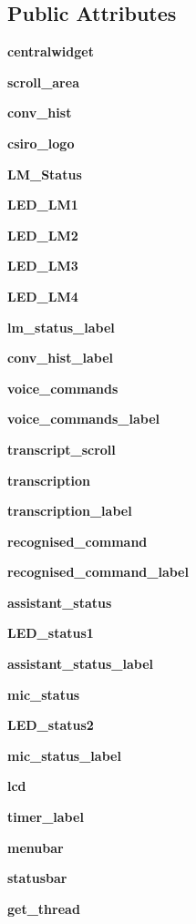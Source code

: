 \subsection*{Public Attributes}
\begin{DoxyCompactItemize}
\item 
\textbf{ centralwidget}
\item 
\textbf{ scroll\+\_\+area}
\item 
\textbf{ conv\+\_\+hist}
\item 
\textbf{ csiro\+\_\+logo}
\item 
\textbf{ L\+M\+\_\+\+Status}
\item 
\textbf{ L\+E\+D\+\_\+\+L\+M1}
\item 
\textbf{ L\+E\+D\+\_\+\+L\+M2}
\item 
\textbf{ L\+E\+D\+\_\+\+L\+M3}
\item 
\textbf{ L\+E\+D\+\_\+\+L\+M4}
\item 
\textbf{ lm\+\_\+status\+\_\+label}
\item 
\textbf{ conv\+\_\+hist\+\_\+label}
\item 
\textbf{ voice\+\_\+commands}
\item 
\textbf{ voice\+\_\+commands\+\_\+label}
\item 
\textbf{ transcript\+\_\+scroll}
\item 
\textbf{ transcription}
\item 
\textbf{ transcription\+\_\+label}
\item 
\textbf{ recognised\+\_\+command}
\item 
\textbf{ recognised\+\_\+command\+\_\+label}
\item 
\textbf{ assistant\+\_\+status}
\item 
\textbf{ L\+E\+D\+\_\+status1}
\item 
\textbf{ assistant\+\_\+status\+\_\+label}
\item 
\textbf{ mic\+\_\+status}
\item 
\textbf{ L\+E\+D\+\_\+status2}
\item 
\textbf{ mic\+\_\+status\+\_\+label}
\item 
\textbf{ lcd}
\item 
\textbf{ timer\+\_\+label}
\item 
\textbf{ menubar}
\item 
\textbf{ statusbar}
\item 
\textbf{ get\+\_\+thread}
\end{DoxyCompactItemize}


